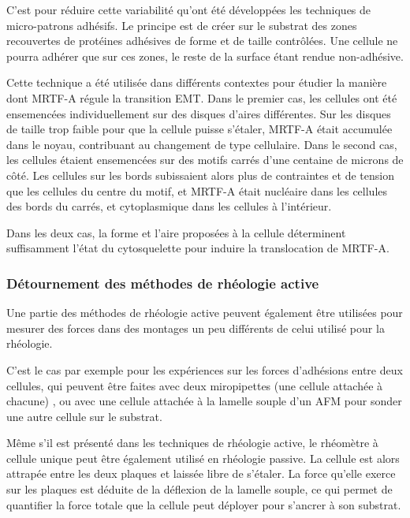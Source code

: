 C'est pour réduire cette variabilité qu'ont été développées les techniques de micro-patrons adhésifs. 
Le principe est de créer sur le substrat des zones recouvertes de protéines adhésives de forme et de taille contrôlées.
Une cellule ne pourra adhérer que sur ces zones, le reste de la surface étant rendue non-adhésive. 

Cette technique a été utilisée dans différents contextes pour étudier la manière dont MRTF-A régule la transition EMT. 
Dans le premier cas, les cellules ont été ensemencées individuellement sur des disques d'aires différentes. Sur les disques de taille trop faible pour que la cellule puisse s'étaler, MRTF-A était accumulée dans le noyau, contribuant au changement de type cellulaire. 
Dans le second cas, les cellules étaient ensemencées sur des motifs carrés d'une centaine de microns de côté. Les cellules sur les bords subissaient alors plus de contraintes et de tension que les cellules du centre du motif, et MRTF-A était nucléaire dans les cellules des bords du carrés, et cytoplasmique dans les cellules à l'intérieur.

Dans les deux cas, la forme et l'aire proposées à la cellule déterminent suffisamment l'état du cytosquelette pour induire la translocation de MRTF-A.  

\subsubsection{Détournement des méthodes de rhéologie active}

Une partie des méthodes de rhéologie active peuvent également être utilisées pour mesurer des forces dans des montages un peu différents de celui utilisé pour la rhéologie. 

C'est le cas par exemple pour les expériences sur les forces d'adhésions entre deux cellules, qui peuvent être faites avec deux miropipettes (une cellule attachée à chacune) \parencite{biro_dual_2015}, ou avec une cellule attachée à la lamelle souple d'un AFM pour sonder une autre cellule sur le substrat. 

Même s'il est présenté dans les techniques de rhéologie active, le rhéomètre à cellule unique peut être également utilisé en rhéologie passive. 
La cellule est alors attrapée entre les deux plaques et laissée libre de s'étaler. La force qu'elle exerce sur les plaques est déduite de la déflexion de la lamelle souple, ce qui permet de quantifier la force totale que la cellule peut déployer pour s'ancrer à son substrat. 

